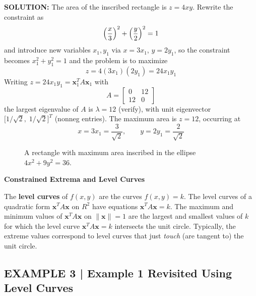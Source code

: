 \documentclass{article}
\newcommand{\redheading}[1]{{\vspace{2mm}\noindent\Large\bfseries\color{red!55!black} #1\par}\vspace{2mm}}
\begin{document}
\textbf{SOLUTION:} The area of the inscribed rectangle is $z=4xy$. Rewrite the constraint
as
\[
  \Bigl(\frac{x}{3}\Bigr)^2+\Bigl(\frac{y}{2}\Bigr)^2=1
\]
and introduce new variables $x_1,y_1$ via $x=3x_1$, $y=2y_1$, so the constraint becomes
$x_1^2+y_1^2=1$ and the problem is to maximize
\[
  z = 4(3x_1)(2y_1) = 24x_1y_1
\]
Writing $z=24x_1y_1=\mathbf{x}_1^T A\mathbf{x}_1$ with
\[
  A=\begin{bmatrix}0&12\\12&0\end{bmatrix}
\]
the largest eigenvalue of $A$ is $\lambda=12$ (verify), with unit eigenvector
$\bigl[1/\sqrt{2},\;1/\sqrt{2}\bigr]^T$ (nonneg entries). The maximum area is $z=12$, occurring at
\[
  x=3x_1=\frac{3}{\sqrt{2}}, \qquad y=2y_1=\frac{2}{\sqrt{2}}
\]

\begin{figure}[ht]
\centering
{}
\caption{A rectangle with maximum area inscribed in the ellipse $4x^2+9y^2=36$.}
\label{fig:742}
\end{figure}

\redheading{Constrained Extrema and Level Curves}

The \textbf{level curves} of $f(x,y)$ are the curves $f(x,y)=k$. The level curves of a
quadratic form $\mathbf{x}^T A\mathbf{x}$ on $R^2$ have equations $\mathbf{x}^T A\mathbf{x}=k$.
The maximum and minimum values of $\mathbf{x}^T A\mathbf{x}$ on $\|\mathbf{x}\|=1$ are the
largest and smallest values of $k$ for which the level curve $\mathbf{x}^T A\mathbf{x}=k$
intersects the unit circle. Typically, the extreme values correspond to level curves that
just \emph{touch} (are tangent to) the unit circle.

\subsection*{EXAMPLE 3 | Example 1 Revisited Using Level Curves}
\end{document}
